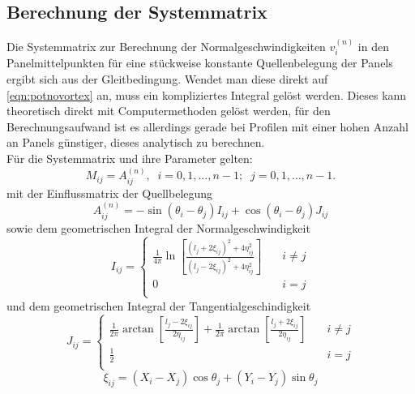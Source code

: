 \subsection{Berechnung der Systemmatrix}
\label{chap:systemmatrixtheory}
Die Systemmatrix zur Berechnung der Normalgeschwindigkeiten $v_i^{(n)}$ in den Panelmittelpunkten für eine stückweise konstante Quellenbelegung der Panels ergibt sich aus der Gleitbedingung. Wendet man diese direkt auf \ref{eqn:potnovortex} an, muss ein kompliziertes Integral gelöst werden. Dieses kann theoretisch direkt mit Computermethoden gelöst werden, für den Berechnungsaufwand ist es allerdings gerade bei Profilen mit einer hohen Anzahl an Panels günstiger, dieses analytisch zu berechnen. \\
Für die Systemmatrix und ihre Parameter gelten:
\begin{equation}
\label{eq:mnovortex}
M_{ij} = A_{ij}^{(n)}, \;\; i = 0, 1, \ldots , n-1; \;\; j = 0,1,\ldots , n-1.
\end{equation}
mit der Einflussmatrix der Quellbelegung
\begin{equation}
\label{eq:An}
A_{ij}^{(n)} = -\sin {(\theta _i - \theta _j)} I_{ij} + \cos{(\theta _i - \theta _j)} J_{ij}
\end{equation}
sowie dem geometrischen Integral der Normalgeschwindigkeit
\begin{equation}
I_{ij} = 
     \begin{cases}
       \frac{1}{4\pi } \ln \left[ \frac{(l_j + 2 \xi_{ij})^2 + 4 \eta_{ij}^2}{(l_j -2 \xi _{ij})^2 + 4 \eta_{ij}^2} \right] &\quad i \neq j \\
       0 &\quad i = j \\
     \end{cases}
\end{equation}
und dem geometrischen Integral der Tangentialgeschindigkeit
\begin{equation}
J_{ij} = 
     \begin{cases}
       \frac{1}{2\pi } \arctan \left[ \frac{l_j - 2 \xi_{ij}}{2 \eta_{ij}} \right] + \frac{1}{2\pi } \arctan \left[ \frac{l_j + 2 \xi_{ij}}{2 \eta_{ij}} \right] &\quad i \neq j \\
       \frac{1}{2} &\quad i = j \\
     \end{cases}
\end{equation}
\begin{equation}
\label{eq:xi}
\xi_{ij} =  (X_i - X_j) \cos \theta _j + (Y_i - Y_j) \sin \theta _j
\end{equation}
